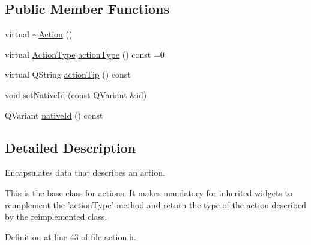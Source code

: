 \subsection*{Public Member Functions}
\begin{DoxyCompactItemize}
\item 
virtual \hyperlink{classOkular_1_1Action_acdb06775d157339256a8ecd55749226c}{$\sim$\+Action} ()
\item 
virtual \hyperlink{classOkular_1_1Action_abe474735af30ea76105595533df9ec47}{Action\+Type} \hyperlink{classOkular_1_1Action_ac4c2ef09b350b4041f8d1cfb261c3234}{action\+Type} () const =0
\item 
virtual Q\+String \hyperlink{classOkular_1_1Action_a359c33818281df712da697c84975952f}{action\+Tip} () const 
\item 
void \hyperlink{classOkular_1_1Action_afbf20754be0d5b902482a1f704f74f74}{set\+Native\+Id} (const Q\+Variant \&id)
\item 
Q\+Variant \hyperlink{classOkular_1_1Action_a3d499dbbf48e003bc880a1d7622a3748}{native\+Id} () const 
\end{DoxyCompactItemize}


\subsection{Detailed Description}
Encapsulates data that describes an action. 

This is the base class for actions. It makes mandatory for inherited widgets to reimplement the 'action\+Type' method and return the type of the action described by the reimplemented class. 

Definition at line 43 of file action.\+h.




